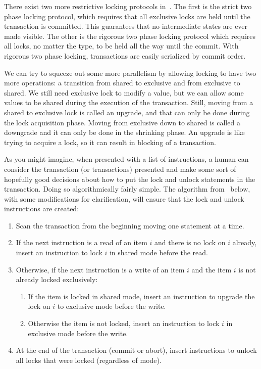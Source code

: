 \documentclass[a4paper]{report}
\begin{document}
There exist two more restrictive locking protocols in~\cite{dsc}. The first is the strict two phase locking protocol, which requires that all exclusive locks are held until the transaction is committed. This guarantees that no intermediate states are ever made visible. The other is the rigorous two phase locking protocol which requires all locks, no matter the type, to be held all the way until the commit. With rigorous two phase locking, transactions are easily serialized by commit order.

We can try to squeeze out some more parallelism by allowing locking to have two more operations: a transition from shared to exclusive and from exclusive to shared. We still need exclusive lock to modify a value, but we can allow some values to be shared during the execution of the transaction. Still, moving from a shared to exclusive lock is called an upgrade, and that can only be done during the lock acquisition phase. Moving from exclusive down to shared is called a downgrade and it can only be done in the shrinking phase. An upgrade is like trying to acquire a lock, so it can result in blocking of a transaction.

As you might imagine, when presented with a list of instructions, a human can consider the transaction (or transactions) presented and make some sort of hopefully good decisions about how to put the lock and unlock statements in the transaction. Doing so algorithmically fairly simple. The algorithm from~\cite{dsc} below, with some modifications for clarification, will ensure that the lock and unlock instructions are created:

\begin{enumerate}
	\item Scan the transaction from the beginning moving one statement at a time.
	\item If the next instruction is a read of an item $i$ and there is no lock on $i$ already, insert an instruction to lock $i$ in shared mode before the read.
	\item Otherwise, if the next instruction is a write of an item $i$ and the item $i$ is not already locked exclusively:
		\begin{enumerate}
			\item If the item is locked in shared mode, insert an instruction to upgrade the lock on $i$ to exclusive mode before the write.
			\item Otherwise the item is not locked, insert an instruction to lock $i$ in exclusive mode before the write.
		\end{enumerate}
	\item At the end of the transaction (commit or abort), insert instructions to unlock all locks that were locked (regardless of mode).
\end{enumerate}
\end{document}
